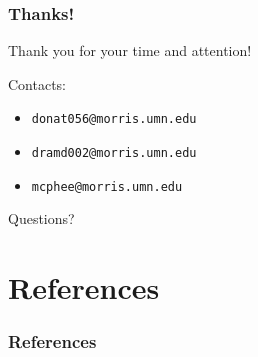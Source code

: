 \documentclass{beamer}
\newcommand{\linespace}{\vskip 0.25cm}
\begin{document}
\begin{frame}
	\frametitle{Thanks!}
	
	Thank you for your time and attention!
		
	\linespace
	\linespace
	
	Contacts:  
	\begin{itemize}
		\item \texttt{donat056@morris.umn.edu}
		\item \texttt{dramd002@morris.umn.edu}
		\item \texttt{mcphee@morris.umn.edu}
	\end{itemize}
	
	\linespace
	\linespace
	
	\begin{center}
	{\huge Questions?}
	\end{center}
\end{frame}

\section*{References}

\begin{frame} 
\frametitle{References}
\nocite{*}

{\tiny }
\end{frame} 
\end{document}
